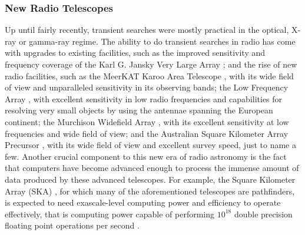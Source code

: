 \documentclass[12pt]{article}
\begin{document}
\subsubsection{New Radio Telescopes}
Up until fairly recently, transient searches were mostly practical in the optical, X-ray or gamma-ray regime. The ability to do transient searches in radio has come with upgrades to existing facilities, such as the improved sensitivity and frequency coverage of the Karl G. Jansky Very Large Array \citep[VLA or JVLA;][]{2011ApJ...739L...1P}; and the rise of new radio facilities, such as the MeerKAT Karoo Area Telescope \citep[MeerKAT;][]{2016mks..confE...1J}, with its wide field of view and unparalleled sensitivity in its observing bands; the Low Frequency Array \citep[LOFAR;][]{2013A&A...556A...2V}, with excellent sensitivity in low radio frequencies and capabilities for resolving very small objects by using the antennae spanning the European continent; the Murchison Widefield Array \citep[MWA][]{2013PASA...30....7T}, with its excellent sensitivity at low frequencies and wide field of view; and the Australian Square Kilometer Array Precursor \citep[ASKAP;][]{2014PASA...31...41H}, with its wide field of view and excellent survey speed, just to name a few. Another crucial component to this new era of radio astronomy is the fact that computers have become advanced enough to process the immense amount of data produced by these advanced telescopes. For example, the Square Kilometer Array (SKA) \citep{2009IEEEP..97.1482D}, for which many of the aforementioned telescopes are pathfinders, is expected to need exascale-level computing power and efficiency to operate effectively, that is computing power capable of performing $10^{18}$ double precision floating point operations per second \citep{doi:10.1177/1094342014549059}. 
\end{document}
